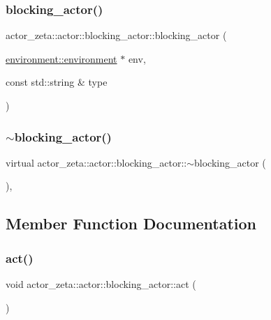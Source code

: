 \subsubsection{\texorpdfstring{blocking\+\_\+actor()}{blocking\_actor()}}
{\footnotesize\ttfamily actor\+\_\+zeta\+::actor\+::blocking\+\_\+actor\+::blocking\+\_\+actor (\begin{DoxyParamCaption}\item[{\hyperlink{classactor__zeta_1_1environment_1_1environment}{environment\+::environment} $\ast$}]{env,  }\item[{const std\+::string \&}]{type }\end{DoxyParamCaption})}

\mbox{\label{classactor__zeta_1_1actor_1_1blocking__actor_ad78b5512e561def8197df4f5cfbba540}} 
\subsubsection{\texorpdfstring{$\sim$blocking\+\_\+actor()}{~blocking\_actor()}}
{\footnotesize\ttfamily virtual actor\+\_\+zeta\+::actor\+::blocking\+\_\+actor\+::$\sim$blocking\+\_\+actor (\begin{DoxyParamCaption}{ }\end{DoxyParamCaption})\hspace{0.3cm}{\ttfamily [inline]}, {\ttfamily [virtual]}}



\subsection{Member Function Documentation}
\mbox{\label{classactor__zeta_1_1actor_1_1blocking__actor_addc9a92e1d9be856cc1842a5c43867f5}} 
\subsubsection{\texorpdfstring{act()}{act()}}
{\footnotesize\ttfamily void actor\+\_\+zeta\+::actor\+::blocking\+\_\+actor\+::act (\begin{DoxyParamCaption}{ }\end{DoxyParamCaption})\hspace{0.3cm}{\ttfamily [virtual]}}

